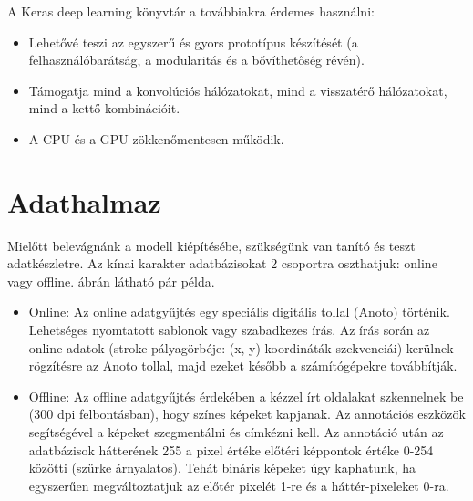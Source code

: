 A Keras deep learning könyvtár a továbbiakra érdemes használni:

\begin{itemize}
\item Lehetővé teszi az egyszerű és gyors prototípus készítését (a felhasználóbarátság, a modularitás és a bővíthetőség révén).
\item Támogatja mind a konvolúciós hálózatokat, mind a visszatérő hálózatokat, mind a kettő kombinációit.
\item A CPU és a GPU zökkenőmentesen működik.
\end{itemize}


\section{Adathalmaz}

Mielőtt belevágnánk a modell kiépítésébe, szükségünk van tanító és teszt adatkészletre. Az kínai karakter adatbázisokat 2 csoportra oszthatjuk: online vagy offline.  ábrán látható pár példa.
\begin{itemize}
\item Online: Az online adatgyűjtés egy speciális digitális tollal (Anoto) történik. Lehetséges nyomtatott sablonok vagy szabadkezes írás. Az írás során az online adatok (stroke pályagörbéje: (x, y) koordináták szekvenciái) kerülnek rögzítésre az Anoto tollal, majd ezeket később a számítógépekre továbbítják.
\item Offline: Az offline adatgyűjtés érdekében a kézzel írt oldalakat szkennelnek be (300 dpi felbontásban), hogy színes képeket kapjanak. Az annotációs eszközök segítségével a képeket szegmentálni és címkézni kell. Az annotáció után az adatbázisok hátterének 255 a pixel értéke előtéri képpontok értéke 0-254 közötti (szürke árnyalatos). Tehát bináris képeket úgy kaphatunk, ha egyszerűen megváltoztatjuk az előtér pixelét 1-re és a háttér-pixeleket 0-ra.
\end{itemize}

